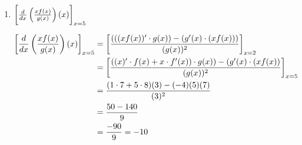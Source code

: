 \documentclass[nooutcomes, handout]{ximera}
\begin{document}
\begin{problem}
\begin{enumerate}
	\item $\bigg[  \frac{d}{dx} \left( \frac{xf(x)}{g(x)} \right) (x) \bigg]_{x=5}$
		\begin{freeResponse}
		\begin{align*}
		\bigg[ \frac{d}{dx} \left( \frac{xf(x)}{g(x)} \right) (x) \bigg]_{x=5} &= \bigg[ \frac{(((xf(x))' \cdot g(x)) - (g'(x) \cdot (xf(x)))}{(g(x))^2} \bigg]_{x=2}  \\
		&= \bigg[ \frac{\left( (x)' \cdot f(x)+x \cdot f'(x) \right) \cdot g(x)) - (g'(x) \cdot (xf(x))}{(g(x))^2} \bigg]_{x=5}  \\
		&= \frac{(1 \cdot 7+ 5 \cdot 8)(3) - (-4)(5)(7)}{(3)^2}  \\
		&= \frac{50 - 140}{9}  \\
		&= \frac{-90}{9} = - 10
		\end{align*}
		\end{freeResponse}

	\end{enumerate}
		
\end{problem}
\end{document}

